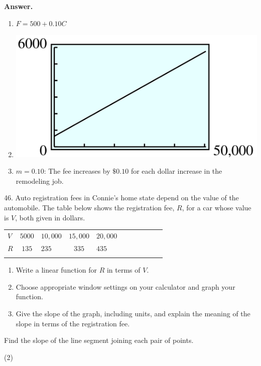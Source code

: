 \documentclass[10pt,]{book}
\theoremstyle{plain}
\theoremstyle{definition}
\theoremstyle{definition}
\theoremstyle{definition}
\theoremstyle{definition}
\numberwithin{equation}{part}
\newcommand{\hrulethin}  {\noalign{\hrule height 0.04em}}
\newcommand{\hrulethick} {\noalign{\hrule height 0.11em}}
\begin{document}
\begin{exerciselist}
\begin{enumerate}[label=*\alph**]
\end{enumerate}
%
\par\smallskip
\par\smallskip
\noindent\textbf{Answer.}\hypertarget{answer-244}{}\quad
\leavevmode%
\begin{enumerate}[label=*\alph**]
\item\hypertarget{li-1613}{}\(F = 500 + 0.10C\)%
\item\hypertarget{li-1614}{}\includegraphics[width=0.4\linewidth]{images/fig-ans-chap1-rev-45.jpg}
%
\item\hypertarget{li-1615}{}\(m = 0.10\): The fee increases by \(\$0.10\) for each dollar increase in the remodeling job.%
\end{enumerate}
%
\item[46.]\hypertarget{exercise-442}{}Auto registration fees in Connie's home state depend on the value of the automobile. The table below shows the registration fee, \(R\), for a car whose value is \(V\), both given in dollars. \begin{table}
\centering
\begin{tabular}{AcAcAcAcAcA}\hrulethick
\(V\)&\(5000\)&\(10,000\)&\(15,000\)&\(20,000\)\tabularnewline\hrulethin
\(R\)&\(135\)&\(235\)&\(335\)&\(435\)\tabularnewline\hrulethin
\end{tabular}
\end{table}
 \leavevmode%
\begin{enumerate}[label=*\alph**]
\item\hypertarget{li-1616}{}Write a linear function for \(R\) in terms of \(V\).%
\item\hypertarget{li-1617}{}Choose appropriate window settings on your calculator and graph your function.%
\item\hypertarget{li-1618}{}Give the slope of the graph, including units, and explain the meaning of the slope in terms of the registration fee.%
\end{enumerate}
%
\par\smallskip
\hypertarget{exercisegroup-59}{}\par\noindent Find the slope of the line segment joining each pair of points.%
\begin{exercisegroup}(2)

\end{exercisegroup}
\end{exerciselist}
\end{document}
